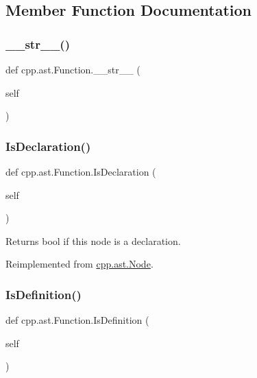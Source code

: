 \subsection{Member Function Documentation}
\mbox{\label{classcpp_1_1ast_1_1_function_aaef91d6a3b1eb2703eebb32d39c45978}} 
\subsubsection{\texorpdfstring{\_\_str\_\_()}{\_\_str\_\_()}}
{\footnotesize\ttfamily def cpp.\+ast.\+Function.\+\_\+\+\_\+str\+\_\+\+\_\+ (\begin{DoxyParamCaption}\item[{}]{self }\end{DoxyParamCaption})}

\mbox{\label{classcpp_1_1ast_1_1_function_ab9120d9a774eb5860d220b3bcdcaa87e}} 
\subsubsection{\texorpdfstring{IsDeclaration()}{IsDeclaration()}}
{\footnotesize\ttfamily def cpp.\+ast.\+Function.\+Is\+Declaration (\begin{DoxyParamCaption}\item[{}]{self }\end{DoxyParamCaption})}

\begin{DoxyVerb}Returns bool if this node is a declaration.\end{DoxyVerb}
 

Reimplemented from \mbox{\hyperlink{classcpp_1_1ast_1_1_node_ab3eca703a79fb65bc25dfbcb7547c79e}{cpp.\+ast.\+Node}}.

\mbox{\label{classcpp_1_1ast_1_1_function_ad5d96144bd8418ac72332bffb21ea86f}} 
\subsubsection{\texorpdfstring{IsDefinition()}{IsDefinition()}}
{\footnotesize\ttfamily def cpp.\+ast.\+Function.\+Is\+Definition (\begin{DoxyParamCaption}\item[{}]{self }\end{DoxyParamCaption})}


